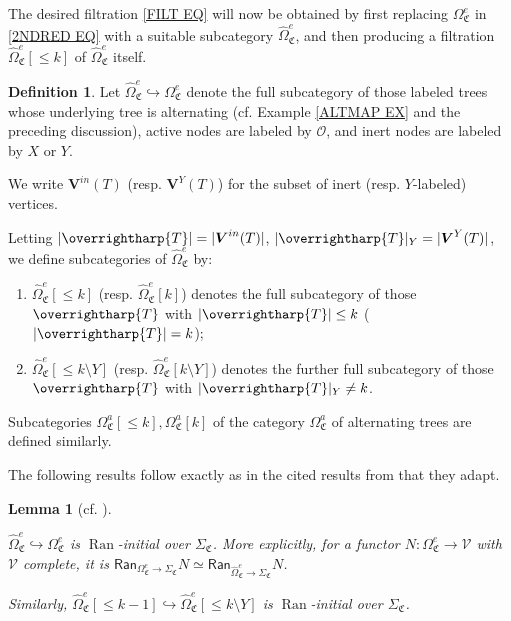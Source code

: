 \documentclass[a4paper,10pt
]{article}%
\numberwithin{equation}{section}
\numberwithin{figure}{section}
\newtheorem{lemma}[equation]{Lemma}%
\theoremstyle{definition} %
\newtheorem{definition}[equation]{Definition}%
\newcommand{\into}{\hookrightarrow}%
\newcommand{\vect}[1]{\text{\overrightharp{\ensuremath{#1}}}}
\DeclareMathOperator{\Ran}{Ran}%
\renewcommand{\O}{\ensuremath{\mathcal O}}
\newcommand{\1}{\ensuremath{\mathbbm 1}}%
\newcommand{\SC}{\Sigma_{\mathfrak C}}
\newcommand{\OC}{\Omega_{\mathfrak C}}
\begin{document}
The desired filtration \eqref{FILT EQ} will now be obtained by
first replacing $\Omega_{\mathfrak C}^e$ in \eqref{2NDRED EQ} with a suitable subcategory $\widehat{\Omega}_{\mathfrak C}^{e}$,
and then producing a filtration
$\widehat{\Omega}_{\mathfrak C}^{e}[\leq k]$
of 
$\widehat{\Omega}_{\mathfrak C}^{e}$ itself.






\begin{definition}
	Let
	$\widehat{\Omega}_{\mathfrak C}^{e} \hookrightarrow \Omega_{\mathfrak C}^{e}$
	denote the full subcategory of those labeled trees whose underlying tree is alternating
	(cf. Example \ref{ALTMAP EX} and the preceding discussion),
	active nodes are labeled by $\O$, 
	and inert nodes are labeled by $X$ or $Y$.
	
	We write $\boldsymbol{V}^{in}(T)$
	(resp. $\boldsymbol{V}^{Y}(T)$)
	for the subset of inert (resp. $Y$-labeled) vertices.
	
	Letting	$|\vect{T}| = |\boldsymbol{V}^{in}(T)|$,
	$|\vect{T}|_Y = |\boldsymbol{V}^{Y}(T)|$,
	we define subcategories of 
	$\widehat{\Omega}_{\mathfrak C}^{e}$ by:
	\begin{enumerate}[label=(\roman*)]
		\item $\widehat{\Omega}_{\mathfrak C}^{e}[\leq k]$ (resp. $\widehat{\Omega}_{\mathfrak C}^{e}[k]$)
		denotes the full subcategory of those $\vect{T}$ with $|\vect{T}| \leq k$ ($|\vect{T}|=k$);
		\item $\widehat{\Omega}_{\mathfrak C}^{e}[\leq k \setminus Y]$ (resp. $\widehat{\Omega}_{\mathfrak C}^{e}[k \setminus Y]$)
		denotes the further full subcategory of those $\vect{T}$ with $|\vect{T}|_Y \neq k$.
	\end{enumerate}
	Subcategories $\OC^a[\leq k], \OC^a[k]$ of the category $\OC^a$
	of alternating trees are defined similarly.
\end{definition}

The following results follow exactly as in the cited results from 
\cite{BP21} that they adapt.

\begin{lemma}[{cf. \cite[Cor. 5.62, Lemma 5.68]{BP21}}]
	\label{LANINT LEM}
	
	$\widehat\Omega_{\mathfrak C}^e \into 
	\Omega_{\mathfrak C}^e$
	is $\Ran$-initial over $\SC$.
	More explicitly, for a functor
	$N\colon \Omega_{\mathfrak C}^e \to \mathcal{V}$
	with $\mathcal{V}$ complete,
	it is
	$\mathsf{Ran}_{\Omega_{\mathfrak C}^e \to \Sigma_{\mathfrak{C}}}
	N \simeq 
	\mathsf{Ran}_{\widehat\Omega_{\mathfrak C}^e \to \Sigma_{\mathfrak{C}}} N$.	
	
	Similarly, $\widehat\Omega_{\mathfrak C}^e[\leq k-1] \into 
	\widehat\Omega_{\mathfrak C}^e[\leq k \setminus Y]$
	is $\Ran$-initial over $\SC$.
\end{lemma}
\end{document}
